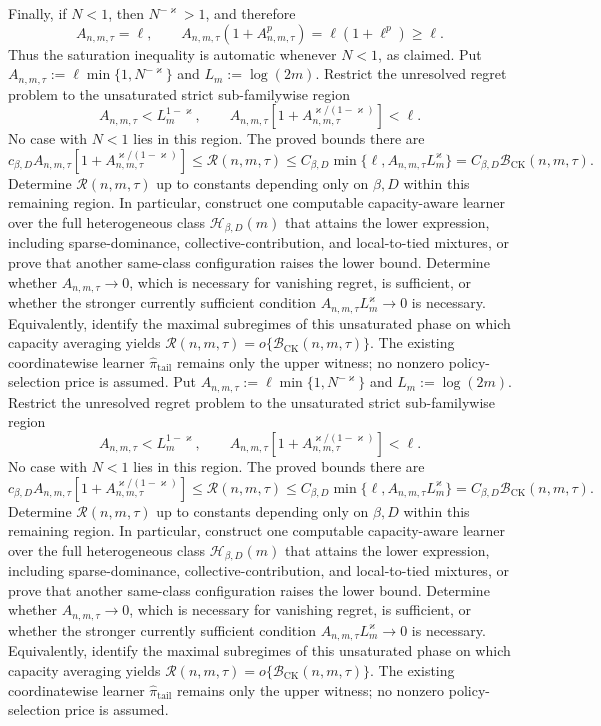 Finally, if \(N<1\), then \(N^{-\varkappa}>1\), and therefore
\[
A_{n,m,\tau}=\ell,
\qquad
A_{n,m,\tau}(1+A_{n,m,\tau}^{p})
=\ell(1+\ell^p)\ge\ell.
\]
Thus the saturation inequality is automatic whenever \(N<1\), as claimed.
Put \(A_{n,m,\tau}:=\ell\min\{1,N^{-\varkappa}\}\) and \(L_m:=\log(2m)\). Restrict the unresolved regret problem to the unsaturated strict sub-familywise region
\[
A_{n,m,\tau}<L_m^{1-\varkappa},
\qquad
A_{n,m,\tau}\left[1+A_{n,m,\tau}^{\varkappa/(1-\varkappa)}\right]<\ell.
\]
No case with \(N<1\) lies in this region. The proved bounds there are
\[
c_{\beta,D}A_{n,m,\tau}
\left[1+A_{n,m,\tau}^{\varkappa/(1-\varkappa)}\right]
\le\mathcal R(n,m,\tau)
\le C_{\beta,D}\min\{\ell,A_{n,m,\tau}L_m^{\varkappa}\}
=C_{\beta,D}\mathcal B_{\mathrm{CK}}(n,m,\tau).
\]
Determine \(\mathcal R(n,m,\tau)\) up to constants depending only on \(\beta,D\) within this remaining region. In particular, construct one computable capacity-aware learner over the full heterogeneous class \(\mathcal H_{\beta,D}(m)\) that attains the lower expression, including sparse-dominance, collective-contribution, and local-to-tied mixtures, or prove that another same-class configuration raises the lower bound. Determine whether \(A_{n,m,\tau}\to0\), which is necessary for vanishing regret, is sufficient, or whether the stronger currently sufficient condition \(A_{n,m,\tau}L_m^{\varkappa}\to0\) is necessary. Equivalently, identify the maximal subregimes of this unsaturated phase on which capacity averaging yields \(\mathcal R(n,m,\tau)=o\{\mathcal B_{\mathrm{CK}}(n,m,\tau)\}\). The existing coordinatewise learner \(\widehat\pi_{\mathrm{tail}}\) remains only the upper witness; no nonzero policy-selection price is assumed.
Put \(A_{n,m,\tau}:=\ell\min\{1,N^{-\varkappa}\}\) and \(L_m:=\log(2m)\). Restrict the unresolved regret problem to the unsaturated strict sub-familywise region
\[
A_{n,m,\tau}<L_m^{1-\varkappa},
\qquad
A_{n,m,\tau}\left[1+A_{n,m,\tau}^{\varkappa/(1-\varkappa)}\right]<\ell.
\]
No case with \(N<1\) lies in this region. The proved bounds there are
\[
c_{\beta,D}A_{n,m,\tau}
\left[1+A_{n,m,\tau}^{\varkappa/(1-\varkappa)}\right]
\le\mathcal R(n,m,\tau)
\le C_{\beta,D}\min\{\ell,A_{n,m,\tau}L_m^{\varkappa}\}
=C_{\beta,D}\mathcal B_{\mathrm{CK}}(n,m,\tau).
\]
Determine \(\mathcal R(n,m,\tau)\) up to constants depending only on \(\beta,D\) within this remaining region. In particular, construct one computable capacity-aware learner over the full heterogeneous class \(\mathcal H_{\beta,D}(m)\) that attains the lower expression, including sparse-dominance, collective-contribution, and local-to-tied mixtures, or prove that another same-class configuration raises the lower bound. Determine whether \(A_{n,m,\tau}\to0\), which is necessary for vanishing regret, is sufficient, or whether the stronger currently sufficient condition \(A_{n,m,\tau}L_m^{\varkappa}\to0\) is necessary. Equivalently, identify the maximal subregimes of this unsaturated phase on which capacity averaging yields \(\mathcal R(n,m,\tau)=o\{\mathcal B_{\mathrm{CK}}(n,m,\tau)\}\). The existing coordinatewise learner \(\widehat\pi_{\mathrm{tail}}\) remains only the upper witness; no nonzero policy-selection price is assumed.

